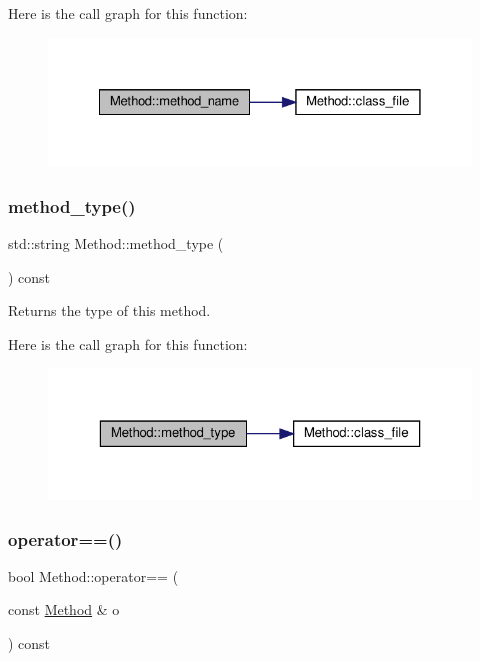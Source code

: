 Here is the call graph for this function\+:
\nopagebreak
\begin{figure}[H]
\begin{center}
\leavevmode
\includegraphics[width=328pt]{classMethod_ab0855cbda89f070acc27ebff025ffd15_cgraph}
\end{center}
\end{figure}
\mbox{\label{classMethod_a86015f24da420dc7502bdac6138a4a47}} 
\subsubsection{\texorpdfstring{method\+\_\+type()}{method\_type()}}
{\footnotesize\ttfamily std\+::string Method\+::method\+\_\+type (\begin{DoxyParamCaption}{ }\end{DoxyParamCaption}) const}



Returns the type of this method. 

Here is the call graph for this function\+:
\nopagebreak
\begin{figure}[H]
\begin{center}
\leavevmode
\includegraphics[width=323pt]{classMethod_a86015f24da420dc7502bdac6138a4a47_cgraph}
\end{center}
\end{figure}
\mbox{\label{classMethod_afa02f09f3037782d08463433465181b6}} 
\subsubsection{\texorpdfstring{operator==()}{operator==()}}
{\footnotesize\ttfamily bool Method\+::operator== (\begin{DoxyParamCaption}\item[{const \hyperlink{classMethod}{Method} \&}]{o }\end{DoxyParamCaption}) const}

